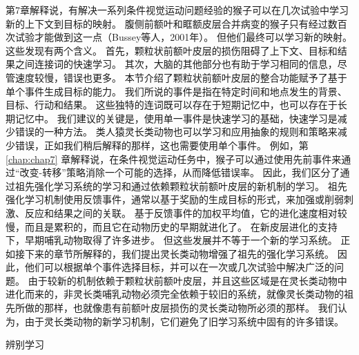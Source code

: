 第7章解释说，有解决一系列条件视觉运动问题经验的猴子可以在几次试验中学习新的上下文到目标的映射。
腹侧前额叶和眶额皮层合并病变的猴子只有经过数百次试验才能做到这一点（Bussey等人，2001年）。
但他们最终可以学习新的映射。这些发现有两个含义。
首先，颗粒状前额叶皮层的损伤阻碍了上下文、目标和结果之间连接词的快速学习。
其次，大脑的其他部分也有助于学习相同的信息，尽管速度较慢，错误也更多。
本节介绍了颗粒状前额叶皮层的整合功能赋予了基于单个事件生成目标的能力。
我们所说的事件是指在特定时间和地点发生的背景、目标、行动和结果。
这些独特的连词既可以存在于短期记忆中，也可以存在于长期记忆中。
我们建议的关键是，使用单一事件是快速学习的基础，快速学习是减少错误的一种方法。
类人猿灵长类动物也可以学习和应用抽象的规则和策略来减少错误，正如我们稍后解释的那样，这也需要使用单个事件。
例如，第 \ref{chap:chap7} 章解释说，在条件视觉运动任务中，猴子可以通过使用先前事件来通过“改变-转移”策略消除一个可能的选择，从而降低错误率。
因此，我们区分了通过祖先强化学习系统的学习和通过依赖颗粒状前额叶皮层的新机制的学习。
祖先强化学习机制使用反馈事件，通常以基于奖励的生成目标的形式，来加强或削弱刺激、反应和结果之间的关联。
基于反馈事件的加权平均值，它的进化速度相对较慢，而且是累积的，而且它在动物历史的早期就进化了。
在新皮层进化的支持下，早期哺乳动物取得了许多进步。
但这些发展并不等于一个新的学习系统。
正如接下来的章节所解释的，我们提出灵长类动物增强了祖先的强化学习系统。
因此，他们可以根据单个事件选择目标，并可以在一次或几次试验中解决广泛的问题。
由于较新的机制依赖于颗粒状前额叶皮层，并且这些区域是在灵长类动物中进化而来的，非灵长类哺乳动物必须完全依赖于较旧的系统，就像灵长类动物的祖先所做的那样，也就像患有前额叶皮层损伤的灵长类动物所必须的那样。
我们认为，由于灵长类动物的新学习机制，它们避免了旧学习系统中固有的许多错误。



辨别学习


